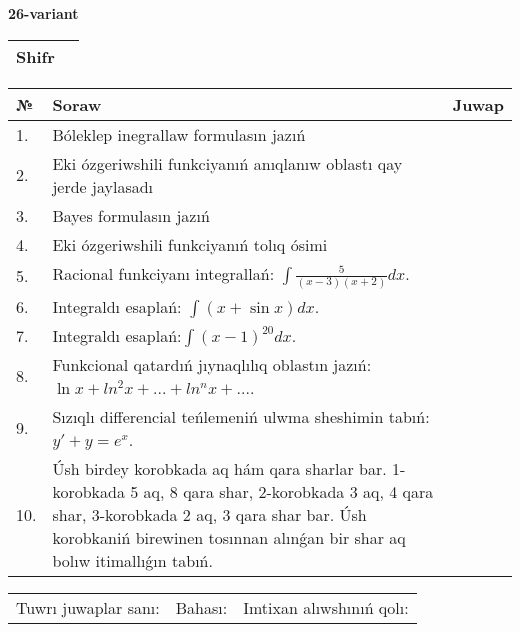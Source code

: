 \documentclass{article}
\begin{document}
  \egroup
  
  \newpage
  
  
  \textbf{26-variant}\\
  
  \bgroup
  \def\arraystretch{1.6} %
  
  \begin{tabular}{|m{5.7cm}|m{9.5cm}|}
  \hline
  Shifr & \\
  \hline
  \end{tabular}
  
  \vspace{1cm}
  
  \begin{tabular}{|m{0.7cm}|m{10cm}|m{4cm}|}
  \hline
  № & Soraw & Juwap \\
  \hline
  1. & Bóleklep inegrallaw formulasın jazıń &  \\
  \hline
  2. & Eki ózgeriwshili funkciyanıń anıqlanıw oblastı qay jerde jaylasadı &  \\
  \hline
  3. & Bayes formulasın jazıń &  \\
  \hline
  4. & Eki ózgeriwshili funkciyanıń tolıq ósimi &  \\
  \hline
  5. & Racional funkciyanı integrallań: \(\int{\frac{5}{(x - 3)(x + 2)}dx}\). &  \\
  \hline
  6. & Integraldı esaplań: \(\int{(x + \sin x)dx}\). &  \\
  \hline
  7. & Integraldı esaplań:\(\int{(x - 1)^{20}}dx\). &  \\
  \hline
  8. & Funkcional qatardıń jıynaqlılıq oblastın jazıń: \(\ln x + ln^2 x + ... + ln^{n}x + ...\). &  \\
  \hline
  9. & Sızıqlı differencial teńlemeniń ulwma sheshimin tabıń: \(y' + y = e^{x}\). &  \\
  \hline
  10. & Úsh birdey korobkada aq hám qara sharlar bar. 1-korobkada 5 aq, 8 qara shar, 2-korobkada 3 aq, 4 qara shar, 3-korobkada 2 aq, 3 qara shar bar. Úsh korobkaniń birewinen tosınnan alınǵan bir shar aq bolıw itimallıǵın tabıń. &  \\
  \hline
  \end{tabular}
  
  \vspace{1cm}
  
  \begin{tabular}{lll}
  Tuwrı juwaplar sanı: \underline{\hspace{1.5cm}} & 
  Bahası: \underline{\hspace{1.5cm}} & 
  Imtixan alıwshınıń qolı: \underline{\hspace{2cm}} \\
  \end{tabular}
  
\end{document}
